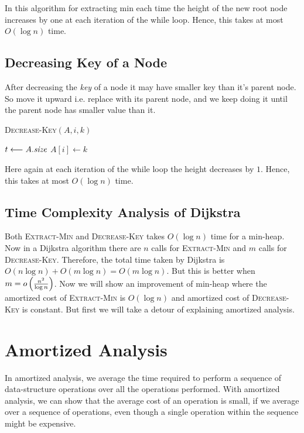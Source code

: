 In this algorithm for extracting min each time the height of the new root node increases by one at each iteration of the while loop. Hence, this takes at most $O(\log n)$ time.
\subsection{Decreasing Key of a Node}
After decreasing the \emph{key} of a node it may have smaller key than it's parent node. So move it upward i.e. replace with its parent node, and we keep doing it until the parent node has smaller value than it.
\begin{algorithm}[]
	\caption{\textsc{Decrease-Key}$(A,i,k)$}
	\DontPrintSemicolon
	$t\longleftarrow A.\emph{size}$\;
	$A[i]\longleftarrow k$\;
\end{algorithm}
Here again at each iteration of the while loop the height decreases by $1$. Hence, this takes at most $O(\log n)$ time.
\subsection{Time Complexity Analysis of Dijkstra}
Both \textsc{Extract-Min} and \textsc{Decrease-Key} takes $O(\log n)$ time for a min-heap. Now in a Dijkstra algorithm there are $n$ calls for \textsc{Extract-Min} and $m$ calls for \textsc{Decrease-Key}. Therefore, the total time taken by Dijkstra is $O(n\log n)+O(m\log n)=O(m\log n)$. But this is better when $m=o\left(\frac{n^2}{\log n}\right)$. Now we will show an improvement of min-heap where the amortized cost of \textsc{Extract-Min} is $O(\log n)$ and amortized cost of \textsc{Decrease-Key} is constant. But first we will take a detour of explaining amortized analysis.
\section{Amortized Analysis}
In amortized analysis, we average the time required to perform a sequence of data-structure operations over all the operations performed. With amortized analysis, we can show that the average cost of an operation is small, if we average over a sequence of operations, even though a single operation within the sequence might be expensive.

